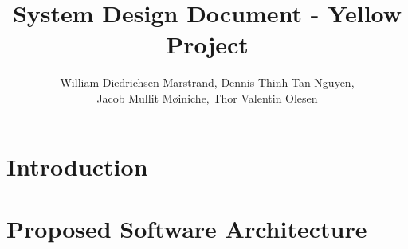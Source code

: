 \documentclass{article}
\title{System Design Document - Yellow Project}
\author{William Diedrichsen Marstrand, Dennis Thinh Tan Nguyen, 
\\Jacob Mullit Møiniche, Thor Valentin Olesen}
\begin{document}
\maketitle

\section{Introduction}
	
	
	\pagebreak
\section{Proposed Software Architecture}
	
	
	\pagebreak
	
	
	
\end{document}
